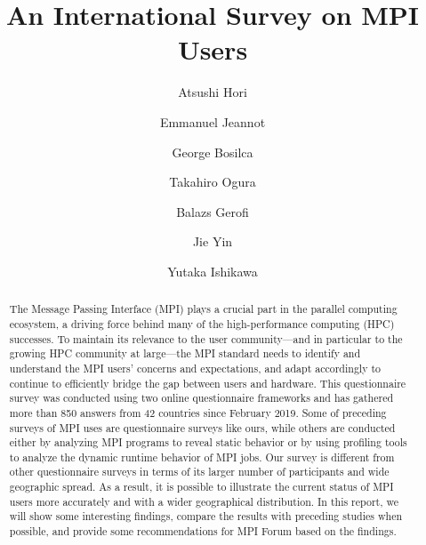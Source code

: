 \documentclass[preprint,5p,times]{elsarticle}
\begin{document}
\title{An International Survey on MPI Users}


\author[1]{Atsushi Hori}
\author[2]{Emmanuel Jeannot}
\author[3]{George Bosilca}
\author[1]{Takahiro Ogura}
\author[1]{Balazs Gerofi}
\author[1]{Jie Yin}
\author[1]{Yutaka Ishikawa}


\begin{abstract}
  The Message Passing Interface (MPI) plays a crucial part in the
  parallel computing ecosystem, a driving force behind many of the
  high-performance computing (HPC) successes. To maintain its relevance
  to the user community---and in particular to the growing HPC community
  at large---the MPI standard needs to identify and understand the MPI
  users' concerns and expectations, and adapt
  accordingly to continue to efficiently bridge the gap between users
  and hardware. This questionnaire survey was conducted
  using two online questionnaire frameworks and has gathered more than 850
  answers from 42 countries since February 2019.
  Some of preceding surveys of MPI uses are questionnaire surveys
  like ours, while others are conducted either by analyzing MPI programs
  to reveal static behavior or by using profiling tools to analyze the dynamic runtime behavior of
  MPI jobs. Our survey is different from
  other questionnaire surveys in terms of its larger number of participants
  and wide geographic spread. As a result, it is possible to
  illustrate the current status of MPI users more accurately and with a
  wider geographical distribution. In this report, we will show some
  interesting findings, compare the results with preceding studies
  when possible, and provide some recommendations for MPI Forum
  based on the findings.
\end{abstract}
\end{document}
